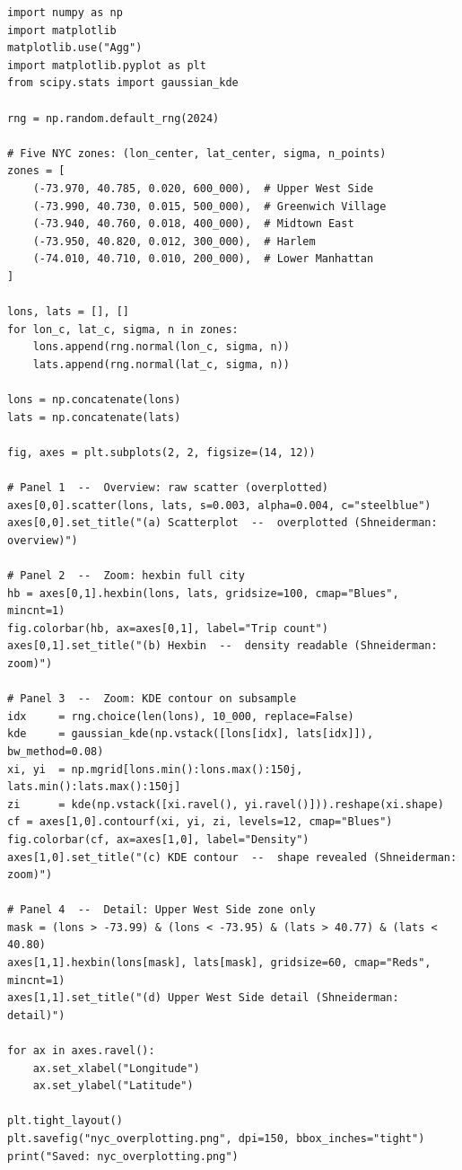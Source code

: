 \begin{lstlisting}[style=pyspark, caption={PE9.1: GPS overplotting simulation}]
import numpy as np
import matplotlib
matplotlib.use("Agg")
import matplotlib.pyplot as plt
from scipy.stats import gaussian_kde

rng = np.random.default_rng(2024)

# Five NYC zones: (lon_center, lat_center, sigma, n_points)
zones = [
    (-73.970, 40.785, 0.020, 600_000),  # Upper West Side
    (-73.990, 40.730, 0.015, 500_000),  # Greenwich Village
    (-73.940, 40.760, 0.018, 400_000),  # Midtown East
    (-73.950, 40.820, 0.012, 300_000),  # Harlem
    (-74.010, 40.710, 0.010, 200_000),  # Lower Manhattan
]

lons, lats = [], []
for lon_c, lat_c, sigma, n in zones:
    lons.append(rng.normal(lon_c, sigma, n))
    lats.append(rng.normal(lat_c, sigma, n))

lons = np.concatenate(lons)
lats = np.concatenate(lats)

fig, axes = plt.subplots(2, 2, figsize=(14, 12))

# Panel 1  --  Overview: raw scatter (overplotted)
axes[0,0].scatter(lons, lats, s=0.003, alpha=0.004, c="steelblue")
axes[0,0].set_title("(a) Scatterplot  --  overplotted (Shneiderman: overview)")

# Panel 2  --  Zoom: hexbin full city
hb = axes[0,1].hexbin(lons, lats, gridsize=100, cmap="Blues", mincnt=1)
fig.colorbar(hb, ax=axes[0,1], label="Trip count")
axes[0,1].set_title("(b) Hexbin  --  density readable (Shneiderman: zoom)")

# Panel 3  --  Zoom: KDE contour on subsample
idx     = rng.choice(len(lons), 10_000, replace=False)
kde     = gaussian_kde(np.vstack([lons[idx], lats[idx]]), bw_method=0.08)
xi, yi  = np.mgrid[lons.min():lons.max():150j, lats.min():lats.max():150j]
zi      = kde(np.vstack([xi.ravel(), yi.ravel()])).reshape(xi.shape)
cf = axes[1,0].contourf(xi, yi, zi, levels=12, cmap="Blues")
fig.colorbar(cf, ax=axes[1,0], label="Density")
axes[1,0].set_title("(c) KDE contour  --  shape revealed (Shneiderman: zoom)")

# Panel 4  --  Detail: Upper West Side zone only
mask = (lons > -73.99) & (lons < -73.95) & (lats > 40.77) & (lats < 40.80)
axes[1,1].hexbin(lons[mask], lats[mask], gridsize=60, cmap="Reds", mincnt=1)
axes[1,1].set_title("(d) Upper West Side detail (Shneiderman: detail)")

for ax in axes.ravel():
    ax.set_xlabel("Longitude")
    ax.set_ylabel("Latitude")

plt.tight_layout()
plt.savefig("nyc_overplotting.png", dpi=150, bbox_inches="tight")
print("Saved: nyc_overplotting.png")
\end{lstlisting}

